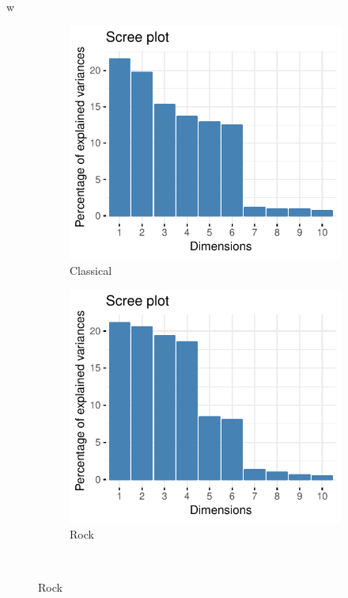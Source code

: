 w\documentclass[11pt, oneside]{article}
\begin{document}
\begin{figure}[h]
\centering  
\begin{subfigure}[b]{0.5\textwidth}
        \includegraphics[width=\textwidth]{class_scree2.pdf} 
        \caption{Classical}
    \end{subfigure}%
    \begin{subfigure}[b]{0.5\textwidth}
        \includegraphics[width=\textwidth]{rock_scree2.pdf} 
        \caption{Rock}
    \end{subfigure} \\

\end{figure}
\end{document}
